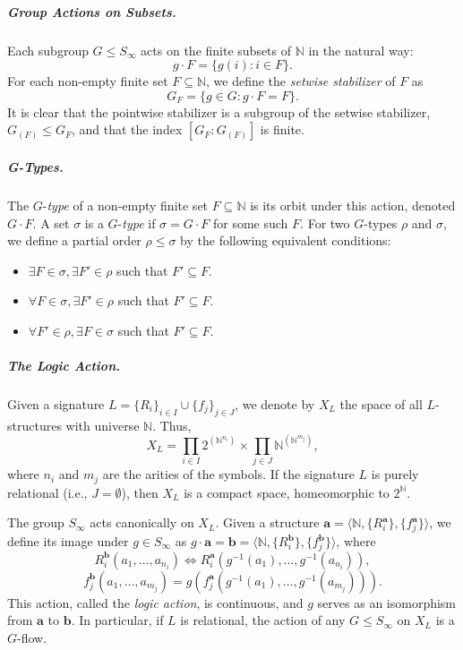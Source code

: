 \subparagraph{Group Actions on Subsets.}
Each subgroup $G \le S_\infty$ acts on the finite subsets of $\mathbb{N}$ in the natural way:
$$
    g \cdot F = \{g(i) : i \in F\}.
$$
For each non-empty finite set $F \subseteq \mathbb{N}$, we define the \textit{setwise stabilizer} of $F$ as
$$
    G_F = \{g \in G : g \cdot F = F\}.
$$
It is clear that the pointwise stabilizer is a subgroup of the setwise stabilizer, $G_{(F)} \le G_F$, and that the index $[G_F : G_{(F)}]$ is finite.

\subparagraph{G-Types.}
The $G$-\textit{type} of a non-empty finite set $F \subseteq \mathbb{N}$ is its orbit under this action, denoted $G \cdot F$. A set $\sigma$ is a $G$-\textit{type} if $\sigma = G \cdot F$ for some such $F$. For two $G$-types $\rho$ and $\sigma$, we define a partial order $\rho \le \sigma$ by the following equivalent conditions:
\begin{itemize}
    \item[$\Leftrightarrow$] $\exists F \in \sigma, \exists F' \in \rho$ such that $F' \subseteq F$.
    \item[$\Leftrightarrow$] $\forall F \in \sigma, \exists F' \in \rho$ such that $F' \subseteq F$.
    \item[$\Leftrightarrow$] $\forall F' \in \rho, \exists F \in \sigma$ such that $F' \subseteq F$.
\end{itemize}

\subparagraph{The Logic Action.}
Given a signature $L = \{R_i\}_{i \in I} \cup \{f_j\}_{j \in J}$, we denote by $X_L$ the space of all $L$-structures with universe $\mathbb{N}$. Thus,
$$
    X_L = \prod_{i \in I} 2^{(\mathbb{N}^{n_i})} \times \prod_{j \in J} \mathbb{N}^{(\mathbb{N}^{m_j})},
$$
where $n_i$ and $m_j$ are the arities of the symbols. If the signature $L$ is purely relational (i.e., $J = \emptyset$), then $X_L$ is a compact space, homeomorphic to $2^\mathbb{N}$.

The group $S_\infty$ acts canonically on $X_L$. Given a structure $\mathbf{a} = \langle \mathbb{N}, \{R^\mathbf{a}_i\}, \{f^\mathbf{a}_j\} \rangle$, we define its image under $g \in S_\infty$ as $g \cdot \mathbf{a} = \mathbf{b} = \langle \mathbb{N}, \{R^\mathbf{b}_i\}, \{f^\mathbf{b}_j\} \rangle$, where
$$
    R^\mathbf{b}_i(a_1, \dots, a_{n_i}) \iff R^\mathbf{a}_i(g^{-1}(a_1), \dots, g^{-1}(a_{n_i})),
$$
$$
    f^\mathbf{b}_j(a_1, \dots, a_{m_j}) = g(f^\mathbf{a}_j(g^{-1}(a_1), \dots, g^{-1}(a_{m_j}))).
$$
This action, called the \textit{logic action}, is continuous, and $g$ serves as an isomorphism from $\mathbf{a}$ to $\mathbf{b}$. In particular, if $L$ is relational, the action of any $G \le S_\infty$ on $X_L$ is a $G$-flow.

